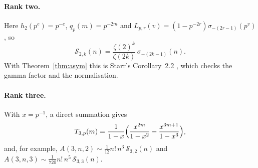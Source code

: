 \documentclass[11pt,a4paper]{article}
\theoremstyle{remark}
\numberwithin{equation}{section}
\newcommand{\Sing}{\mathcal S}
\begin{document}
\paragraph{Rank two.} Here $h_2(p^e)=p^{-e}$, $q_p(m)=p^{-2m}$ and $L_{p,r}(v)=(1-p^{-2r})\sigma_{-(2r-1)}(p^v)$, so
\begin{equation}\label{eq:rank2}
\Sing_{2,k}(n)=\frac{\zeta(2)^k}{\zeta(2k)}\,\sigma_{-(2k-1)}(n).
\end{equation}
With Theorem~\ref{thm:asym} this is Starr's Corollary~2.2 \cite{Starr2026a}, which checks the gamma factor and the normalisation.

\paragraph{Rank three.} With $x=p^{-1}$, a direct summation gives
\[
T_{3,p}(m)=\frac1{1-x}\Bigl(\frac{x^{2m}}{1-x^2}-\frac{x^{3m+1}}{1-x^3}\Bigr),
\]
and, for example, $A(3,n,2)\sim\frac{1}{12}n!\,n^{3}\,\Sing_{3,2}(n)$ and $A(3,n,3)\sim\frac1{720}n!\,n^{5}\,\Sing_{3,3}(n)$.
\end{document}
